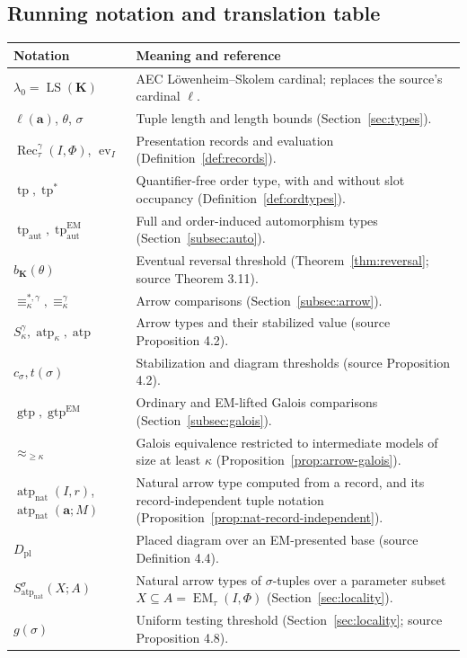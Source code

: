 \documentclass[11pt]{article}
\newcommand{\K}{\mathbf K}
\newcommand{\LS}{\operatorname{LS}}
\newcommand{\atp}{\operatorname{atp}}
\newcommand{\natatp}{\operatorname{atp}_{\mathrm{nat}}}
\newcommand{\gtp}{\operatorname{gtp}}
\newcommand{\auttp}{\operatorname{tp}_{\mathrm{aut}}}
\newcommand{\EMauttp}{\operatorname{tp}^{\mathrm{EM}}_{\mathrm{aut}}}
\newcommand{\tpstar}{\operatorname{tp}^{*}}
\newcommand{\Rec}{\operatorname{Rec}}
\newcommand{\EM}{\operatorname{EM}_{\tau}}
\newcommand{\ba}{\mathbf{a}}
\theoremstyle{plain}
\begin{document}
\subsection*{Running notation and translation table}
\begin{longtable}{@{}p{}p{}@{}}
\toprule
Notation & Meaning and reference\\
\midrule\endhead
$\lambda_0=\LS(\K)$ & AEC L\"owenheim--Skolem cardinal; replaces
the source's cardinal $\ell$.\\
$\ell(\ba)$, $\theta$, $\sigma$ & Tuple length and length bounds
(Section~\ref{sec:types}).\\
$\Rec^\gamma_\tau(I,\Phi)$, $\operatorname{ev}_I$ &
Presentation records and evaluation (Definition~\ref{def:records}).\\
$\operatorname{tp},\tpstar$ & Quantifier-free order type,
with and without slot occupancy (Definition~\ref{def:ordtypes}).\\
$\auttp,\EMauttp$ & Full and order-induced automorphism types
(Section~\ref{subsec:auto}).\\
$b_\K(\theta)$ & Eventual reversal threshold
(Theorem~\ref{thm:reversal}; source Theorem 3.11).\\
$\equiv_\kappa^{*,\gamma},\equiv_\kappa^\gamma$ &
Arrow comparisons (Section~\ref{subsec:arrow}).\\
$S^\gamma_\kappa,\atp_\kappa,\atp$ &
Arrow types and their stabilized value
(source Proposition 4.2).\\
$c_\sigma,t(\sigma)$ & Stabilization and diagram thresholds
(source Proposition 4.2).\\
$\gtp,\gtp^{\mathrm{EM}}$ & Ordinary and EM-lifted
Galois comparisons (Section~\ref{subsec:galois}).\\
$\approx_{\geq\kappa}$ & Galois equivalence restricted
to intermediate models of size at least $\kappa$
(Proposition~\ref{prop:arrow-galois}).\\
$\natatp(I,r)$,
$\natatp(\ba;M)$ & Natural arrow type computed
from a record, and its record-independent tuple notation
(Proposition~\ref{prop:nat-record-independent}).\\
$D_{\mathrm{pl}}$ & Placed diagram over an EM-presented
base (source Definition 4.4).\\
$S^\sigma_{\natatp}(X;A)$ & Natural arrow types of $\sigma$-tuples
over a parameter subset $X\subseteq A=\EM(I,\Phi)$
(Section~\ref{sec:locality}).\\
$g(\sigma)$ & Uniform testing threshold
(Section~\ref{sec:locality}; source Proposition 4.8).\\
\bottomrule
\end{longtable}
\end{document}
